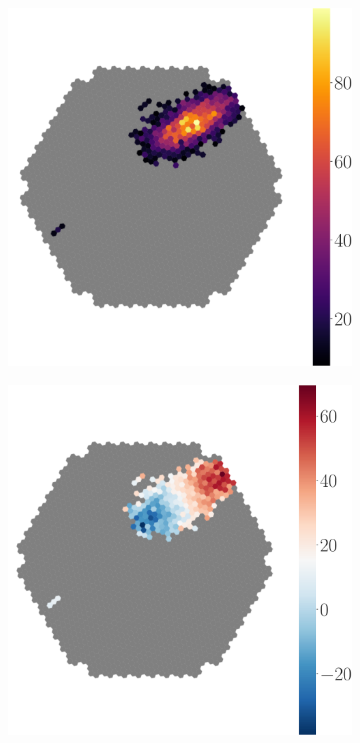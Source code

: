 \begin{figure}
	\centering
	\captionsetup{width=0.9\linewidth}
	\begin{subfigure}{.45\textwidth}
  		\centering
  		\includegraphics[width=\linewidth]{Plots/hillas_cleaned.pdf}
	\end{subfigure}%
	\begin{subfigure}{.45\textwidth}
 		\centering
		\includegraphics[width=\linewidth]{Plots/hillas_cleaned_time.pdf}

\end{subfigure}
\end{figure}

